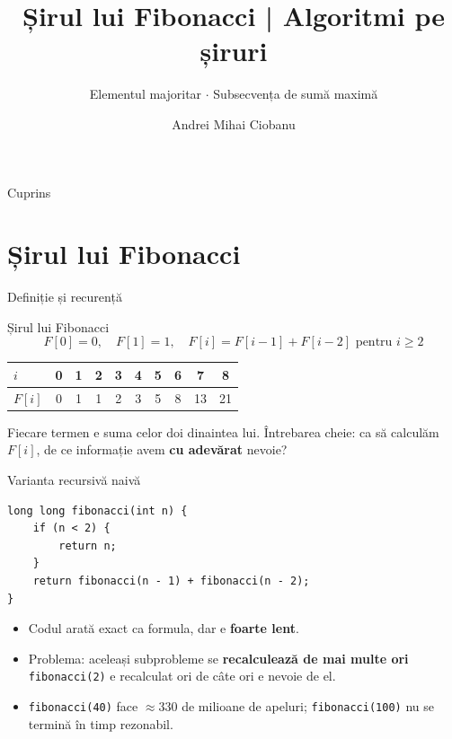 \documentclass{beamer}
\title{Șirul lui Fibonacci | Algoritmi pe șiruri}
\subtitle{Elementul majoritar $\cdot$ Subsecvența de sumă maximă}
\author{Andrei Mihai Ciobanu}
\institute{Algolymp Summer School}
\date{}
\begin{document}
\begin{frame}[shrink]
  \titlepage
\end{frame}

\begin{frame}{Cuprins}
  \tableofcontents
\end{frame}

\section{Șirul lui Fibonacci}

\begin{frame}{Definiție și recurență}
  \begin{block}{Șirul lui Fibonacci}
    \[
      F[0] = 0, \quad F[1] = 1, \quad F[i] = F[i-1] + F[i-2] \text{ pentru } i \geq 2
    \]
  \end{block}

  \smallskip
  \begin{center}
  \begin{tabular}{lccccccccc}
    \toprule
    $i$    & 0 & 1 & 2 & 3 & 4 & 5 & 6 & 7 & 8 \\
    \midrule
    $F[i]$ & 0 & 1 & 1 & 2 & 3 & 5 & 8 & 13 & 21 \\
    \bottomrule
  \end{tabular}
  \end{center}

  \smallskip
  Fiecare termen e suma celor doi dinaintea lui. Întrebarea cheie: ca să calculăm $F[i]$, de ce informație avem \textbf{cu adevărat} nevoie?
\end{frame}

\begin{frame}[fragile]{Varianta recursivă naivă}
  \begin{lstlisting}
long long fibonacci(int n) {
    if (n < 2) {
        return n;
    }
    return fibonacci(n - 1) + fibonacci(n - 2);
}
  \end{lstlisting}
  \begin{itemize}
    \item Codul arată exact ca formula, dar e \textbf{foarte lent}.
    \item Problema: aceleași subprobleme se \textbf{recalculează de mai multe ori} \textemdash{} \lstinline|fibonacci(2)| e recalculat ori de câte ori e nevoie de el.
    \item \lstinline|fibonacci(40)| face $\approx 330$ de milioane de apeluri; \lstinline|fibonacci(100)| nu se termină în timp rezonabil.
  \end{itemize}
\end{frame}
\end{document}
